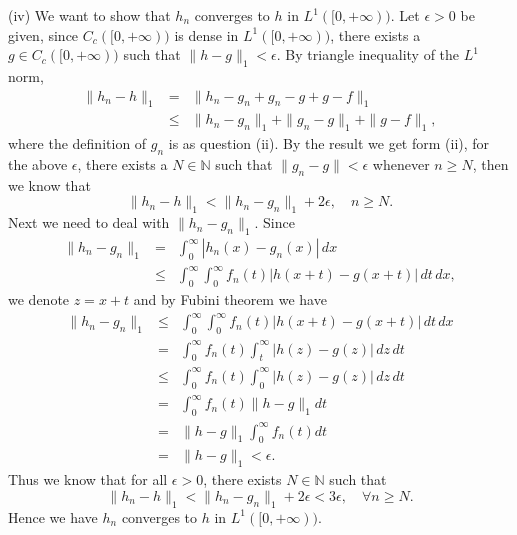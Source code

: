 \documentclass[12pt,a4paper]{ctexart}
\begin{document}
(iv) We want to show that $h_{n}$ converges to $h$ in $L^{1}([0, + \infty))$. Let $\epsilon > 0$ be given, since $C_{c}([0, + \infty))$ is dense in $L^{1}([0, + \infty))$,  there exists a $g \in C_{c} ([0, + \infty))$ such that $\|h - g\|_{1} < \epsilon$. By triangle inequality of the $L^1$ norm,
\begin{eqnarray*}
\|h_{n} - h \|_{1}  & = & \| h_{n} - g_{n} + g_{n} - g + g - f \|_{1} \\
& \leq & \|h_{n} - g_{n}\|_{1} + \|g_{n} - g\|_{1} + \| g - f \|_{1},
\end{eqnarray*}
where the definition of $g_{n}$ is as question (ii). By the result we get form (ii), for the above $\epsilon$, there exists a $N \in \mathbb N$ such that $\|g_{n} - g\| < \epsilon$ whenever $n \geq N$, then we know that
\begin{equation*}
    \|h_{n} - h \|_{1} < \|h_{n} - g_{n}\|_{1} + 2 \epsilon, \quad n \geq N.
\end{equation*}
Next we need to deal with $\|h_{n} - g_{n}\|_{1}$. Since
\begin{eqnarray*}
\|h_{n} - g_{n}\|_{1} & = & \int_{0}^{\infty} |h_{n} (x)- g_{n} (x)| \, d x \\
& \leq & \int_{0}^{\infty} \int_{0}^{\infty} f_{n} (t) |h(x + t) - g(x + t)| \, d t \, d x,
\end{eqnarray*}
we denote $z = x + t$ and by Fubini theorem we have
\begin{eqnarray*}
\|h_{n} - g_{n}\|_{1}  & \leq & \int_{0}^{\infty} \int_{0}^{\infty} f_{n} (t) |h(x + t) - g(x + t)| \, d t \, d x \\
& = & \int_{0}^{\infty}  f_{n} (t) \int_{t}^{\infty} |h(z) - g(z)| \, d z \, d t \\
& \leq & \int_{0}^{\infty}  f_{n} (t) \int_{0}^{\infty} |h(z) - g(z)| \, d z \, d t \\
& = & \int_{0}^{\infty}  f_{n} (t) \|h - g\|_{1} d t \\
& = & \|h - g\|_{1} \int_{0}^{\infty} f_{n} (t) d t \\
& = & \|h - g\|_{1} < \epsilon.
\end{eqnarray*}
Thus we know that for all $\epsilon > 0$, there exists $N \in \mathbb N$ such that
\begin{equation*}
    \|h_{n} - h\|_{1} < \|h_{n} - g_{n}\|_{1} + 2 \epsilon < 3 \epsilon, \quad \forall n \geq N.
\end{equation*}
Hence we have $h_{n}$ converges to $h$ in $L^{1}([0, + \infty))$.

\newpage
\end{document}
